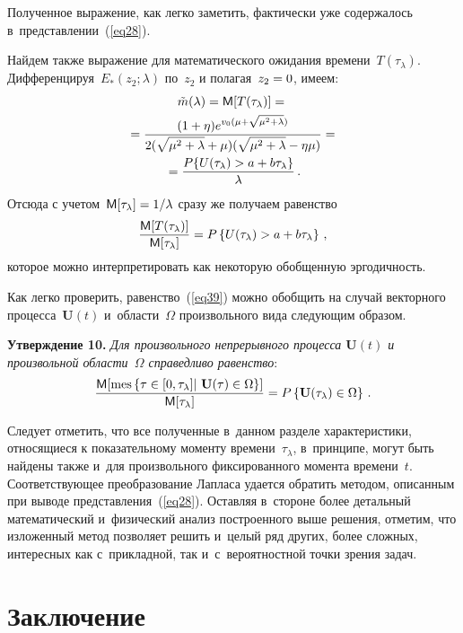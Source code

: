 \begin{multicols}{2}
Полученное выражение, как легко заметить, фактически уже содержалось в~представлении~(\ref{eq28}).

Найдем также выражение для математического ожидания времени~$T(\tau_\lambda)$. Дифференцируя~$E_*(z_2; \lambda)$ по~$z_2$ и полагая~$z_2\hm=0$, имеем:
\begin{multline*}
  \tilde m(\lambda) ={\sf M}[T(\tau_\lambda)] ={}\\
   {}=\displaystyle\frac{\displaystyle (1+\eta) e^{v_0( \mu +\sqrt{ \mu ^2+\lambda})}\mathstrut}{\displaystyle 2(\sqrt{ \mu ^2+\lambda}+ \mu )(\sqrt{ \mu^2+\lambda}-\eta  \mu )\mathstrut} ={}\\
  {}= \displaystyle\frac{\displaystyle P\{ U(\tau_\lambda) > a +b \tau_\lambda\}\mathstrut}{\displaystyle \lambda\mathstrut}\,.
\end{multline*}
Отсюда с учетом~${\sf M}[\tau_\lambda] \hm= {1}/{\lambda}$ сразу же получаем равенство
\begin{equation}
  \label{eq39}
  \displaystyle\frac{\displaystyle {\sf M}[T(\tau_\lambda)]\mathstrut}{\displaystyle {\sf M}[\tau_\lambda]\mathstrut} = P\left\{ U(\tau_\lambda) > a +b \tau_\lambda\right\}\,,
\end{equation}
которое можно интерпретировать как некоторую обобщенную эргодичность.

Как легко проверить, равенство~(\ref{eq39}) можно обобщить на случай векторного процесса~$\mathbf{U}(t)$ и~об\-ласти~$\Omega$ произвольного вида следующим образом.

\noindent
\textbf{Утверждение 10.}
  \textit{Для произвольного непрерывного процесса $\mathbf{U}(t)$ и произвольной области~$\Omega$ справедливо равенство}:
  \begin{equation*}
    \displaystyle\frac{\displaystyle {\sf M}[\mathrm{mes}\, \{ \tau \in [0, \tau_\lambda]|\ \mathbf{U}(\tau) \in \Omega \}]\mathstrut}{\displaystyle {\sf M}[\tau_\lambda]\mathstrut} = P\left\{ \mathbf{U}(\tau_\lambda) \in \Omega\right \}\,.
  \end{equation*}


Следует отметить, что все полученные в~данном разделе характеристики, относящиеся к показательному моменту времени~$\tau_\lambda$, в~принципе, могут быть найдены также и~для произвольного фиксированного момента времени~$t$. Соответствующее преобразование Лапласа удается обратить методом, описанным при выводе представления~(\ref{eq28}). Остав\-ляя в~стороне более детальный математический и~физический анализ построенного выше решения, отметим, что изложенный метод позволяет решить и~целый ряд других, более сложных, интересных как с~прикладной, так и~с~вероятностной точки зрения задач.

\section{Заключение}


\end{multicols}
